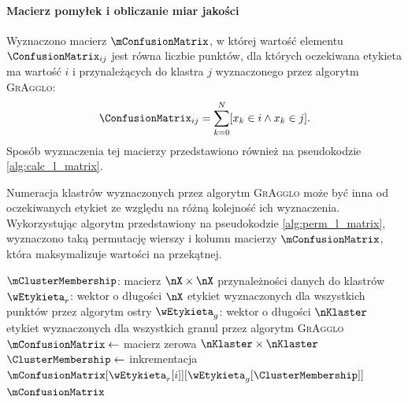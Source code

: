 \documentclass[a4paper,twoside,12pt]{book}
\newcommand{\procedura}[1]{\textsc{#1}}
\newcommand{\MojAlg}{\procedura{GrAgglo}}
\begin{document}
\paragraph{Macierz pomyłek i obliczanie miar jakości}

Wyznaczono macierz $\mConfusionMatrix$, w której wartość elementu $\ConfusionMatrix_{ij}$ jest równa liczbie punktów, dla których oczekiwana etykieta ma wartość $i$ i przynależących do klastra $j$ wyznaczonego przez algorytm \MojAlg{}:
\begin{align}
\ConfusionMatrix_{ij} = \sum_{k=0}^{N} [x_{k} \in i \wedge x_{k} \in j].
\end{align}
%
Sposób wyznaczenia tej macierzy przedstawiono również na pseudokodzie \ref{alg:calc_l_matrix}.

Numeracja klastrów wyznaczonych przez algorytm \MojAlg{} może być inna od oczekiwanych etykiet ze względu na różną kolejność ich wyznaczenia. Wykorzystując algorytm przedstawiony na pseudokodzie \ref{alg:perm_l_matrix}, wyznaczono taką permutację wierszy i kolumn macierzy $\mConfusionMatrix$, która maksymalizuje wartości na przekątnej. 

\begin{algorithm}[t]
	\caption{Wyznaczenie macierzy $\mConfusionMatrix$}
	\label{alg:calc_l_matrix}
	\begin{algorithmic}[1]
		\Require $\mClusterMembership$: macierz $\nX \times \nX$ przynależności danych do klastrów
		\Require $\wEtykieta_{r}$: wektor o długości $\nX$ etykiet wyznaczonych dla wszystkich punktów przez algorytm ostry
		\Require $\wEtykieta_{g}$: wektor o długości $\nKlaster$ etykiet wyznaczonych dla wszystkich granul przez algorytm \MojAlg
		\State $\mConfusionMatrix \gets$ macierz zerowa $\nKlaster \times \nKlaster$
		\State $\ClusterMembership \gets$  
		\State inkrementacja $\mConfusionMatrix[\wEtykieta_{r}[i]][\wEtykieta_{g}[\ClusterMembership]]$
		\EndFor
		\State \Return $\mConfusionMatrix$
		\EndProcedure
	\end{algorithmic}
\end{algorithm}
\end{document}
